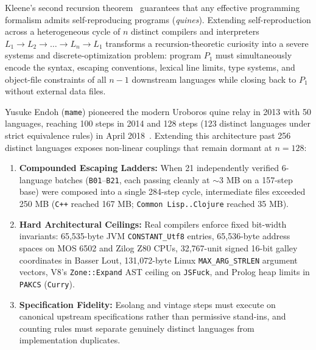 \documentclass[10pt,twocolumn]{article}
\theoremstyle{definition}
\begin{document}
Kleene's second recursion theorem~\cite{kleene1938} guarantees that any effective programming formalism admits self-reproducing programs (\emph{quines}). Extending self-reproduction across a heterogeneous cycle of $n$ distinct compilers and interpreters $L_1 \to L_2 \to \dots \to L_n \to L_1$ transforms a recursion-theoretic curiosity into a severe systems and discrete-optimization problem: program $P_1$ must simultaneously encode the syntax, escaping conventions, lexical line limits, type systems, and object-file constraints of all $n - 1$ downstream languages while closing back to $P_1$ without external data files.

Yusuke Endoh (\texttt{mame}) pioneered the modern Uroboros quine relay in 2013 with 50 languages, reaching 100 steps in 2014 and 128 steps (123 distinct languages under strict equivalence rules) in April 2018~\cite{endoh2018}. Extending this architecture past 256 distinct languages exposes non-linear couplings that remain dormant at $n = 128$:
\begin{enumerate}
  \item \textbf{Compounded Escaping Ladders:} When 21 independently verified 6-language batches (\texttt{B01}--\texttt{B21}, each passing cleanly at $\sim$3 MB on a 157-step base) were composed into a single 284-step cycle, intermediate files exceeded 250 MB (\texttt{C++} reached 167 MB; \texttt{Common Lisp..Clojure} reached 35 MB).
  \item \textbf{Hard Architectural Ceilings:} Real compilers enforce fixed bit-width invariants: 65,535-byte JVM \texttt{CONSTANT\_Utf8} entries, 65,536-byte address spaces on MOS 6502 and Zilog Z80 CPUs, 32,767-unit signed 16-bit galley coordinates in Basser Lout, 131,072-byte Linux \texttt{MAX\_ARG\_STRLEN} argument vectors, V8's \texttt{Zone::Expand} AST ceiling on \texttt{JSFuck}, and Prolog heap limits in \texttt{PAKCS} (\texttt{Curry}).
  \item \textbf{Specification Fidelity:} Esolang and vintage steps must execute on canonical upstream specifications rather than permissive stand-ins, and counting rules must separate genuinely distinct languages from implementation duplicates.
\end{enumerate}
\end{document}

